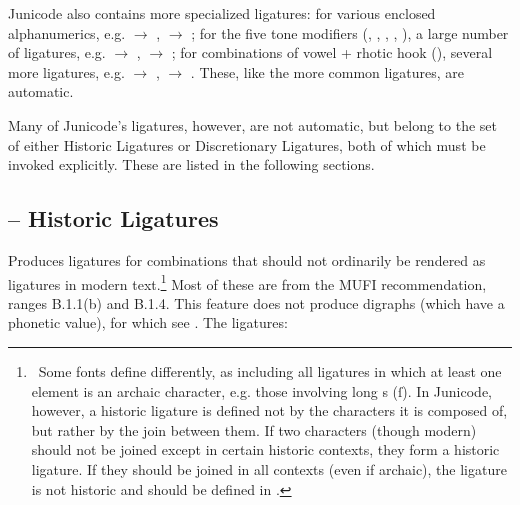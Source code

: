 Junicode also contains more specialized ligatures: for various enclosed alphanumerics, e.g.
 $\rightarrow $ ,  $\rightarrow $ ;
for the five tone modifiers
(, , , , ), a large number of
ligatures, e.g.  $\rightarrow $ ,
 $\rightarrow $ ;
for combinations of vowel + rhotic hook (), several more ligatures, e.g.  $\rightarrow $ ,
 $\rightarrow $ .
These, like the more common ligatures, are automatic.

Many of Junicode’s
ligatures, however, are not automatic, but belong to the set of either Historic Ligatures
or Discretionary Ligatures, both of which must be invoked explicitly. These are listed in the following sections.

\subsection{ – Historic Ligatures}

Produces ligatures for combinations that should not ordinarily be rendered as
ligatures in modern text.\footnote{\ Some
fonts define  differently, as including all ligatures in which at least one
element is an archaic character, e.g.
those involving long s (\textrm{ſ\hspace{0.2em}}). In Junicode, however, a
historic ligature is defined not by the characters it is composed of, but
rather by the join between them. If two characters (though modern) should not be joined except
in certain historic contexts, they form a historic ligature. If they should be
joined in all contexts (even if archaic), the ligature is not historic
and should be defined in .} Most of these are from the MUFI recommendation,
ranges B.1.1(b) and B.1.4. This feature does
not produce digraphs (which have a phonetic value), for which see
. The ligatures:

